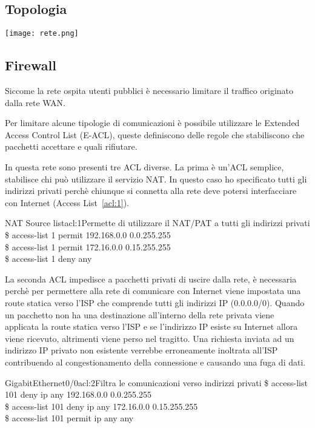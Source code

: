 \begin{landscape}
    \subsection{Topologia}%
    \label{sub:topologia}
    \thispagestyle{empty}
    \texttt{[image: rete.png]}
\end{landscape}

\subsection{Firewall}
Siccome la rete ospita utenti pubblici \`e necessario limitare il traffico originato dalla rete WAN\@.

Per limitare alcune tipologie di comunicazioni \`e possibile utilizzare le Extended Access Control List (E-ACL), queste definiscono delle regole che stabiliscono che pacchetti accettare e quali rifiutare.

In questa rete sono presenti tre ACL diverse. La prima \`e un'ACL semplice, stabilisce chi pu\`o utilizzare il servizio NAT\@. In questo caso ho specificato tutti gli indirizzi privati perch\`e chiunque si connetta alla rete deve potersi interfacciare con Internet (Access List~\ref{acl:1}).

\begin{cmds}[inside]{NAT Source list}{acl:1}{Permette di utilizzare il NAT/PAT a tutti gli indirizzi privati}
    \$ access-list 1 permit 192.168.0.0 0.0.255.255\\
    \$ access-list 1 permit 172.16.0.0 0.15.255.255\\
    \$ access-list 1 deny any
\end{cmds}

La seconda ACL impedisce a pacchetti privati di uscire dalla rete, \`e necessaria perch\`e per permettere alla rete di comunicare con Internet viene impostata una route statica verso l'ISP che comprende tutti gli indirizzi IP (0.0.0.0/0). Quando un pacchetto non ha una destinazione all'interno della rete privata viene applicata la route statica verso l'ISP e se l'indirizzo IP esiste su Internet allora viene ricevuto, altrimenti viene perso nel tragitto. Una richiesta inviata ad un indirizzo IP privato non esistente verrebbe erroneamente inoltrata all'ISP contribuendo al congestionamento della connessione e causando una fuga di dati. 

\begin{cmds}[out]{GigabitEthernet0/0}{acl:2}{Filtra le comunicazioni verso indirizzi privati}
    \$ access-list 101 deny ip any 192.168.0.0 0.0.255.255\\
    \$ access-list 101 deny ip any 172.16.0.0 0.15.255.255\\
    \$ access-list 101 permit ip any any
\end{cmds}

